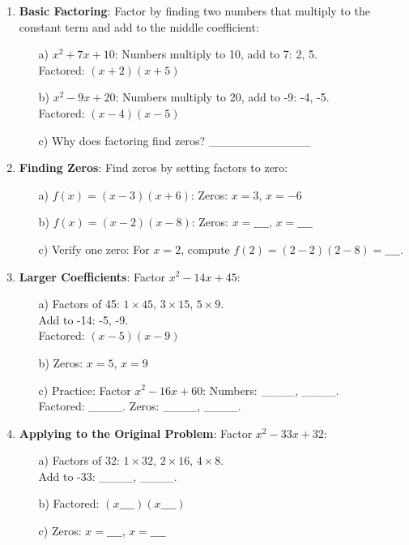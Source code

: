 \documentclass[12pt]{article}
\begin{document}
\begin{enumerate}[label=17.\arabic*]
    \item \textbf{Basic Factoring}: Factor by finding two numbers that multiply to the constant term and add to the middle coefficient:
    \begin{enumerate}
        \item[a)] \( x^2 + 7x + 10 \): Numbers multiply to 10, add to 7: 2, 5. \\
        Factored: \( (x + 2)(x + 5) \)
        \item[b)] \( x^2 - 9x + 20 \): Numbers multiply to 20, add to -9: -4, -5. \\
        Factored: \( (x - 4)(x - 5) \)
        \item[c)] Why does factoring find zeros? \_\_\_\_\_\_\_\_\_\_\_\_
    \end{enumerate}
    \item \textbf{Finding Zeros}: Find zeros by setting factors to zero:
    \begin{enumerate}
        \item[a)] \( f(x) = (x - 3)(x + 6) \): Zeros: \( x = 3 \), \( x = -6 \)
        \item[b)] \( f(x) = (x - 2)(x - 8) \): Zeros: \( x = \_\_\_\_ \), \( x = \_\_\_\_ \)
        \item[c)] Verify one zero: For \( x = 2 \), compute \( f(2) = (2 - 2)(2 - 8) = \_\_\_\_ \).
    \end{enumerate}
    \item \textbf{Larger Coefficients}: Factor \( x^2 - 14x + 45 \):
    \begin{enumerate}
        \item[a)] Factors of 45: \( 1 \times 45 \), \( 3 \times 15 \), \( 5 \times 9 \). \\
        Add to -14: -5, -9. \\
        Factored: \( (x - 5)(x - 9) \)
        \item[b)] Zeros: \( x = 5 \), \( x = 9 \)
        \item[c)] Practice: Factor \( x^2 - 16x + 60 \): Numbers: \_\_\_\_, \_\_\_\_. \\
        Factored: \_\_\_\_. Zeros: \_\_\_\_, \_\_\_\_.
    \end{enumerate}
    \item \textbf{Applying to the Original Problem}: Factor \( x^2 - 33x + 32 \):
    \begin{enumerate}
        \item[a)] Factors of 32: \( 1 \times 32 \), \( 2 \times 16 \), \( 4 \times 8 \). \\
        Add to -33: \_\_\_\_, \_\_\_\_.
        \item[b)] Factored: \( (x \_\_\_\_)(x \_\_\_\_) \)
        \item[c)] Zeros: \( x = \_\_\_\_ \), \( x = \_\_\_\_ \)
    \end{enumerate}
\end{enumerate}
\end{document}
